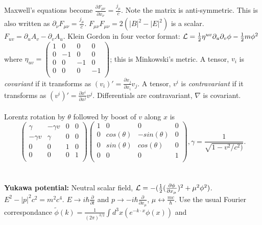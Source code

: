 Maxwell's equations become ${\frac {\partial F_{\mu \nu}} {\partial x_{\nu}}} = {\frac {j_{\mu}} c}$.
Note the matrix is anti-symmetric.
This is also written as $\partial_{\nu} F_{\mu \nu}= {\frac {j_{\mu}} c}$.
$F_{\mu \nu} F_{\mu \nu} = 2(|B|^2-|E|^2)$ is a scalar.  $F_{uv}= \partial_u A_v- \partial_v A_u$.
Klein Gordon in four vector format:
${\cal L}= {\frac 1 2} \eta^{uv} \partial_u \partial_v \phi - {\frac 1 2} m \phi^2$ where
$\eta_{uv}=
\left(
\begin{array}{cccc}
1 & 0 & 0 & 0 \\
0 & -1 & 0 & 0 \\
0 & 0 & -1 & 0 \\
0 & 0 & 0 & -1 \\
\end{array}
\right)
$; this is Minkowski's metric.
A tensor, $v_i$ is \emph{covariant} if it transforms as $(v_i)'= {\frac {\partial x_j} {\partial x_i}} v_j$.
A tensor, $v^i$ is \emph{contravariant} if it transforms as $(v^i)'= {\frac {\partial x^i} {\partial x^j}} v^j$.
Differentials are contravariant, $\nabla$ is covariant.
\\
\\
Lorentz rotation by $\theta$ followed by boost of $v$ along $x$ is
$$
\left(
\begin{array}{cccc}
\gamma & -\gamma v & 0 & 0 \\
-\gamma v & \gamma & 0 & 0 \\
0 & 0 & 1 & 0 \\
0 & 0 & 0 & 1 \\
\end{array}
\right)
\left(
\begin{array}{cccc}
1 & 0 & 0 & 0 \\
0 & cos(\theta) &  -sin(\theta) & 0 \\
0 &  sin(\theta) &  cos(\theta) & 0 \\
0 & 0 & 0 & 1 \\
\end{array}
\right), \gamma= {\frac 1 {\sqrt {1-v^2/c^2)}}}.$$
\\
\\
{\bf Yukawa potential:}  Neutral scalar field,
${\cal L}= - ({\frac 1 2} ({\frac {\partial \phi} {\partial x_{\mu}}})^2
+ \mu^2 \phi^2)$.  $E^2- |p|^2 c^2= m^2 c^4$.  
$E \rightarrow i \hbar {\frac {\partial} {\partial t}}$ and
$p \rightarrow - i \hbar {\frac {\partial} {\partial x_{\mu}}}$, $\mu \leftrightarrow {\frac {mc} {\hbar}}$.
Use the usual Fourier correspondance
$\tilde{\phi}(k)= {\frac 1 {(2 \pi)^{3/2}}} \int d^3 x (e^{- k \cdot x} \phi(x))$ and
